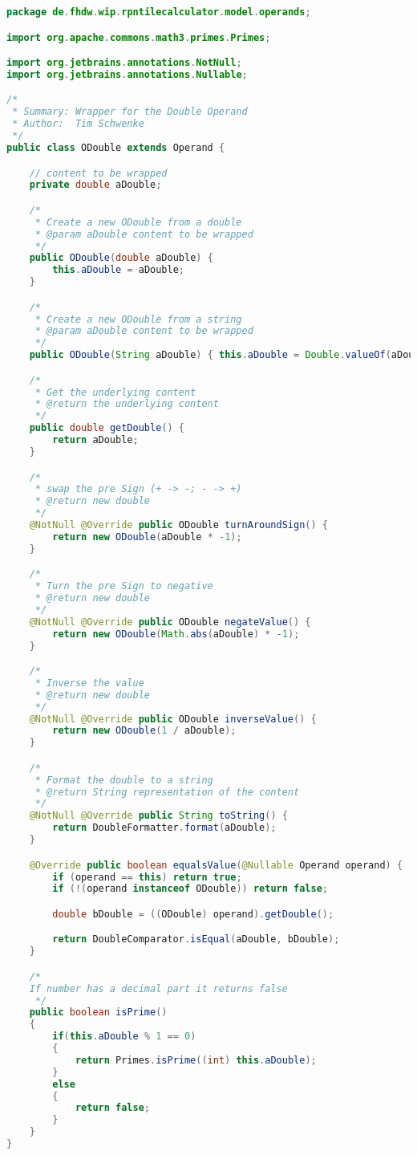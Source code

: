 \begin{lstlisting}[caption=ODouble (Schwenke),label=list:ODouble,language=Java]
package de.fhdw.wip.rpntilecalculator.model.operands;

import org.apache.commons.math3.primes.Primes;

import org.jetbrains.annotations.NotNull;
import org.jetbrains.annotations.Nullable;

/*
 * Summary: Wrapper for the Double Operand
 * Author:  Tim Schwenke
 */
public class ODouble extends Operand {

    // content to be wrapped
    private double aDouble;

    /*
     * Create a new ODouble from a double
     * @param aDouble content to be wrapped
     */
    public ODouble(double aDouble) {
        this.aDouble = aDouble;
    }

    /*
     * Create a new ODouble from a string
     * @param aDouble content to be wrapped
     */
    public ODouble(String aDouble) { this.aDouble = Double.valueOf(aDouble); }

    /*
     * Get the underlying content
     * @return the underlying content
     */
    public double getDouble() {
        return aDouble;
    }

    /*
     * swap the pre Sign (+ -> -; - -> +)
     * @return new double
     */
    @NotNull @Override public ODouble turnAroundSign() {
        return new ODouble(aDouble * -1);
    }

    /*
     * Turn the pre Sign to negative
     * @return new double
     */
    @NotNull @Override public ODouble negateValue() {
        return new ODouble(Math.abs(aDouble) * -1);
    }

    /*
     * Inverse the value
     * @return new double
     */
    @NotNull @Override public ODouble inverseValue() {
        return new ODouble(1 / aDouble);
    }

    /*
     * Format the double to a string
     * @return String representation of the content
     */
    @NotNull @Override public String toString() {
        return DoubleFormatter.format(aDouble);
    }

    @Override public boolean equalsValue(@Nullable Operand operand) {
        if (operand == this) return true;
        if (!(operand instanceof ODouble)) return false;

        double bDouble = ((ODouble) operand).getDouble();

        return DoubleComparator.isEqual(aDouble, bDouble);
    }

    /*
    If number has a decimal part it returns false
     */
    public boolean isPrime()
    {
        if(this.aDouble % 1 == 0)
        {
            return Primes.isPrime((int) this.aDouble);
        }
        else
        {
            return false;
        }
    }
}
\end{lstlisting}    

